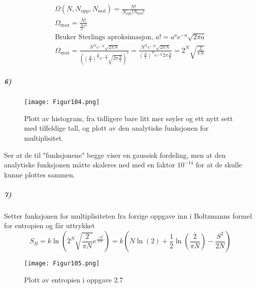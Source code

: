 \documentclass[11pt, A4paper,norsk]{article}
\begin{document}
				\begin{gather*}
\Omega(N, N_{\text{opp}}, N_{\text{ned}}) = \frac{N!}{N_{\text{opp}}! N_{\text{ned}}!} \\
\Omega_{\text{max}} = \frac{N!}{\frac{N}{2}!^2} \\
\text{Bruker Sterlings aproksimasjon, $a! = a^a e^{-a}\sqrt{2 \pi a}$} \\
\Omega_{\text{max}} = \frac{N^N e^{-N}\sqrt{2 \pi N}}{\left( \left( \frac{N}{2} \right)^{\frac{N}{2}} e^{-\frac{N}{2}} \sqrt{2 \pi \frac{N}{2}} \right)^2} = \frac{N^N e^{-N}\sqrt{2 \pi N}}{\left( \frac{N}{2} \right)^{N} e^{-N} 2 \pi \frac{N}{2}} = 2^{N} \sqrt{\frac{2}{\pi N}}
				\end{gather*}











			\subparagraph{6)}
				\begin{figure}[H]
\texttt{[image: Figur104.png]}
\caption{Plott av histogram, fra tidligere bare litt mer søyler og ett nytt sett med tilfeldige tall, og plott av den analytiske funksjonen for multiplisitet.}
				\end{figure}
				\begin{flushleft}
Ser at de til "funksjonene" begge viser en gaussisk fordeling, men at den analytiske funksjonen måtte skaleres ned med en faktor $10^{-14}$ for at de skulle kunne plottes sammen.
				\end{flushleft}












			\subparagraph{7)}
				\begin{flushleft}
Setter funksjonen for multiplisiteten fra forrige oppgave inn i Boltzmanns formel for entropien og får uttrykket
$$S_B = k \ln\left( 2^{N} \sqrt{\frac{2}{\pi N}} e^{\frac{- S^2}{2N}} \right) = k \left( N \ln(2) + \frac{1}{2} \ln \left( \frac{2}{\pi N} \right) - \frac{S^2}{2N} \right)$$
				\end{flushleft}
				\begin{figure}[H]
\texttt{[image: Figur105.png]}
\caption{Plott av entropien i oppgave $2.7$}
				\end{figure}

\end{document}
